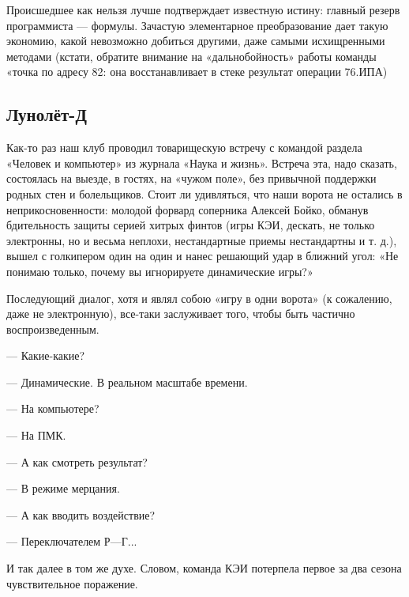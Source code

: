 \documentclass[11pt,a4paper,oneside]{article}
\begin{document}
Происшедшее как нельзя лучше подтверждает известную истину: главный резерв программиста — формулы. Зачастую элементарное преобразование дает такую экономию, какой невозможно добиться другими, даже самыми исхищренными методами (кстати, обратите внимание на «дальнобойность» работы команды «точка по адресу 82: она восстанавливает в стеке результат операции 76.ИПА)

\subsection{Лунолёт-Д}
Как-то раз наш клуб проводил товарищескую встречу с командой раздела «Человек и компьютер» из журнала «Наука и жизнь». Встреча эта, надо сказать, состоялась на выезде, в гостях, на «чужом поле», без привычной поддержки родных стен и болельщиков. Стоит ли удивляться, что наши ворота не остались в неприкосновенности: молодой форвард соперника Алексей Бойко, обманув бдительность защиты серией хитрых финтов (игры КЭИ, дескать, не только электронны, но и весьма неплохи, нестандартные приемы нестандартны и т. д.), вышел с голкипером один на один и нанес решающий удар в ближний угол: «Не понимаю только, почему вы игнорируете динамические игры?»

Последующий диалог, хотя и являл собою «игру в одни ворота» (к сожалению, даже не электронную), все-таки заслуживает того, чтобы быть частично воспроизведенным.

— Какие-какие?

— Динамические. В реальном масштабе времени.

— На компьютере?

— На ПМК.

— А как смотреть результат?

— В режиме мерцания.

— А как вводить воздействие?

— Переключателем Р—Г...

И так далее в том же духе. Словом, команда КЭИ потерпела первое за два сезона чувствительное поражение.
\end{document}
